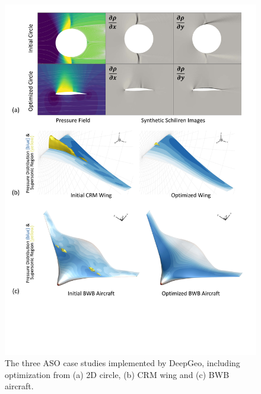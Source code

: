 \begin{figure}[!htb]
    \begin{center}
        \includegraphics[width=0.9\linewidth]{chapter5/fig/teaser.pdf}
    \end{center}
    \vspace{-3mm}
    \caption{
        \small The three ASO case studies implemented by DeepGeo, including optimization from (a) 2D circle, (b) CRM wing and (c) BWB aircraft.
    }
    \label{ch5:fig:teaser}
\end{figure}